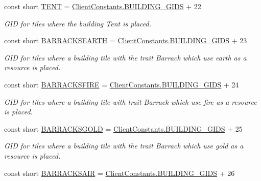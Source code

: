 \begin{DoxyCompactItemize}
const short \hyperlink{classClient_1_1Common_1_1Constants_1_1BuildingGid_a3a87d1e77adbbeef8c62225877887dff}{T\+E\+N\+T} = \hyperlink{classClient_1_1Common_1_1Constants_1_1ClientConstants_ad2e944ac733f952d3d0c2e24fe5d14ad}{Client\+Constants.\+B\+U\+I\+L\+D\+I\+N\+G\+\_\+\+G\+I\+D\+S} + 22
\begin{DoxyCompactList}\small\item\em G\+I\+D for tiles where the building Tent is placed. \end{DoxyCompactList}\item 
const short \hyperlink{classClient_1_1Common_1_1Constants_1_1BuildingGid_a0d00300a106b5539506caca786ece775}{B\+A\+R\+R\+A\+C\+K\+S\+E\+A\+R\+T\+H} = \hyperlink{classClient_1_1Common_1_1Constants_1_1ClientConstants_ad2e944ac733f952d3d0c2e24fe5d14ad}{Client\+Constants.\+B\+U\+I\+L\+D\+I\+N\+G\+\_\+\+G\+I\+D\+S} + 23
\begin{DoxyCompactList}\small\item\em G\+I\+D for tiles where a building tile with the trait Barrack which use earth as a resource is placed. \end{DoxyCompactList}\item 
const short \hyperlink{classClient_1_1Common_1_1Constants_1_1BuildingGid_a084e44ff1c9033fe6108d7f36495e24b}{B\+A\+R\+R\+A\+C\+K\+S\+F\+I\+R\+E} = \hyperlink{classClient_1_1Common_1_1Constants_1_1ClientConstants_ad2e944ac733f952d3d0c2e24fe5d14ad}{Client\+Constants.\+B\+U\+I\+L\+D\+I\+N\+G\+\_\+\+G\+I\+D\+S} + 24
\begin{DoxyCompactList}\small\item\em G\+I\+D for tiles where a building tile with trait Barrack which use fire as a resource is placed. \end{DoxyCompactList}\item 
const short \hyperlink{classClient_1_1Common_1_1Constants_1_1BuildingGid_abd33d04a9f704c2f66905081edb46a35}{B\+A\+R\+R\+A\+C\+K\+S\+G\+O\+L\+D} = \hyperlink{classClient_1_1Common_1_1Constants_1_1ClientConstants_ad2e944ac733f952d3d0c2e24fe5d14ad}{Client\+Constants.\+B\+U\+I\+L\+D\+I\+N\+G\+\_\+\+G\+I\+D\+S} + 25
\begin{DoxyCompactList}\small\item\em G\+I\+D for tiles where a building tile with the trait Barrack which use gold as a resource is placed. \end{DoxyCompactList}\item 
const short \hyperlink{classClient_1_1Common_1_1Constants_1_1BuildingGid_a14a50b9e62c224dc01dd8ad75ff88ab1}{B\+A\+R\+R\+A\+C\+K\+S\+A\+I\+R} = \hyperlink{classClient_1_1Common_1_1Constants_1_1ClientConstants_ad2e944ac733f952d3d0c2e24fe5d14ad}{Client\+Constants.\+B\+U\+I\+L\+D\+I\+N\+G\+\_\+\+G\+I\+D\+S} + 26

\end{DoxyCompactItemize}

